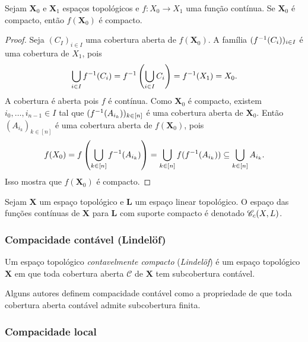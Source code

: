 \begin{proposition}
Sejam $\bm X_0$ e $\bm X_1$ espaços topológicos e $f\colon X_0 \to X_1$ uma função contínua. Se $\bm X_0$ é compacto, então $f(\bm X_0)$ é compacto.
\end{proposition}
\begin{proof}
Seja $(C_I)_{i \in I}$ uma cobertura aberta de $f(\bm X_0)$. A família $(f^{-1}(C_i))_{i \in I}$ é  uma cobertura de $X_1$, pois
	\begin{equation*}
	\bigcup_{i \in I}f^{-1}(C_i) = f^{-1}\left(\bigcup_{i \in I}C_i\right) = f^{-1}(X_1) = X_0.
	\end{equation*}
A cobertura é aberta pois $f$ é contínua. Como $\bm X_0$ é compacto, existem $i_0, \ldots, i_{n-1} \in I$ tal que $(f^{-1}(A_{i_k}))_{k \in [n]}$ é uma cobertura aberta de $\bm X_0$. Então $(A_{i_k})_{k \in [n]}$ é uma cobertura aberta de $f(\bm X_0)$, pois
	\begin{equation*}
	f(X_0) = f\left(\bigcup_{k \in [n]} f ^{-1}(A_{i_k})\right) = \bigcup_{k \in [n]} f(f^{-1}(A_{i_k})) \subseteq  \bigcup_{k \in [n]} A_{i_k}.
	\end{equation*}
Isso mostra que $f(\bm X_0)$ é compacto.
\end{proof}

\begin{definition}
Sejam $\bm X$ um espaço topológico e $\bm L$ um espaço linear topológico. O espaço das funções contínuas de $\bm X$ para $\bm L$ com suporte compacto é denotado $\mathscr{C}_c(X,L)$.
\end{definition}

\subsubsection{Compacidade contável (Lindelöf)}

\begin{definition}
Um espaço topológico \emph{contavelmente compacto} (\emph{Lindelöf}) é um espaço topológico $\bm X$ em que toda cobertura aberta $\mathcal C$ de $\bm X$ tem subcobertura contável.
\end{definition}

Alguns autores definem compacidade contável como a propriedade de que toda cobertura aberta contável admite subcobertura finita.

\subsubsection{Compacidade local}

